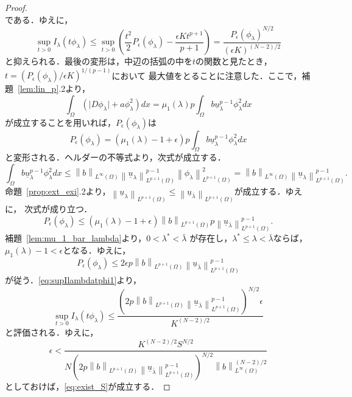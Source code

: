 \begin{proof}
\[ \]
 である．ゆえに，
\begin{equation}
 \sup_{t > 0} I_\lambda (t \phi_\lambda) \leq \sup_{t > 0} \left(
                                                            \frac{t^2}{2} P_\epsilon 
 (\phi_\lambda) - \frac{\epsilon K t^{p+1}}{p+1} \right) =  
 \frac{P_\epsilon(\phi_\lambda)^{N/2}}{\left( \epsilon K
                                         \right)^{(N-2)/2}}
 \label{eq:supIlambdatphi1} 
\end{equation}
と抑えられる．最後の変形は，中辺の括弧の中を$t$の関数と見たとき，
$t = ( P_\epsilon(\phi_\lambda) / \epsilon K )^{1/(p-1)}$において
最大値をとることに注意した．ここで，補題~\ref{lem:lin_p}.2より，
\[
 \int_\Omega \left( \lvert D\phi_\lambda \rvert + a \phi_\lambda^2
 \right) dx = \mu_1(\lambda) p \int_\Omega b
 \underline{u}_\lambda^{p-1} \phi_\lambda^2 dx
\]
が成立することを用いれば，$P_\epsilon(\phi_\lambda)$は
\[
 P_\epsilon(\phi_\lambda) = \left( \mu_1(\lambda) - 1 + \epsilon
 \right) p \int_\Omega b \underline{u}_\lambda^{p-1} \phi_\lambda^2 dx
\]
と変形される．ヘルダーの不等式より，次式が成立する．
\[
 \int_\Omega b \underline{u}_\lambda^{p-1} \phi_\lambda^2 dx \leq
 \left\| b \right\|_{L^\infty(\Omega)} \left\| \underline{u}_\lambda
 \right\|_{L^{p+1}(\Omega)}^{p-1} \left\| \phi_\lambda
 \right\|_{L^{p+1}(\Omega)}^2 = \left\| b \right\|_{L^\infty(\Omega)}
 \left\| \underline{u}_\lambda 
 \right\|_{L^{p+1}(\Omega)}^{p-1}.
\]
命題~\ref{prop:ext_exi}.2より，$\left\| \underline{u}_\lambda 
 \right\|_{L^{p+1}(\Omega)} \leq \left\| \underline{u}_{\bar{\lambda}} 
 \right\|_{L^{p+1}(\Omega)}$が成立する．ゆえに，
次式が成り立つ．
\[
 P_\epsilon(\phi_\lambda) \leq (\mu_1(\lambda) - 1 + \epsilon) \left\|
 b \right\|_{L^{p+1}(\Omega)} p \left\| \underline{u}_{\bar{\lambda}}
 \right\|_{L^{p+1}(\Omega)}^{p-1}.
\]
補題~\ref{lem:mu_1_bar_lambda}より，$0 < \lambda^{*} < \bar{\lambda}$
が存在し，$\lambda^{*} \leq \lambda < \bar{\lambda}$ならば，
$\mu_1(\lambda) - 1 < \epsilon$となる．ゆえに，
\[
 P_\epsilon(\phi_\lambda) \leq 2\epsilon p \left\|
 b \right\|_{L^{p+1}(\Omega)} \left\| \underline{u}_{\bar{\lambda}}
 \right\|_{L^{p+1}(\Omega)}^{p-1}
\]
が従う．\eqref{eq:supIlambdatphi1}より，
\[
 \sup_{t > 0} I_\lambda (t \phi_\lambda) \leq \frac{\left( 2p \left\|
 b \right\|_{L^{p+1}(\Omega)} \left\| \underline{u}_{\bar{\lambda}}
 \right\|_{L^{p+1}(\Omega)}^{p-1} \right)^{N/2} \epsilon}{K^{(N-2)/2}}
\]
と評価される．ゆえに，
\begin{equation}
 \epsilon < \frac{K^{(N-2)/2} S^{N/2}}{N
 \left( 2p \left\|
  b \right\|_{L^{p+1}(\Omega)} \left\| \underline{u}_{\bar{\lambda}}
 \right\|_{L^{p+1}(\Omega)}^{p-1} \right)^{N/2}
  \left\| b
  \right\|_{L^\infty(\Omega)} ^{(N-2)/2}}
 \label{eq:epsilon_gutaiteki}
\end{equation}
としておけば，\eqref{eq:exist_S}が成立する． \qedhere
\end{proof}

